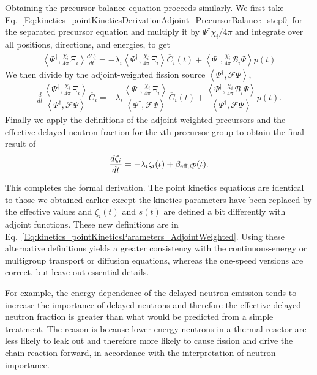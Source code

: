 Obtaining the precursor balance equation proceeds similarly. We first take Eq.~\eqref{Eq:kinetics_pointKineticsDerivationAdjoint_PrecursorBalance_step0} for the separated precursor equation and multiply it by $\Psi^\dagger \chi_i/4\pi$ and integrate over all positions, directions, and energies, to get
\begin{align}
  \left< \Psi^\dagger , \frac{\chi_i}{4\pi} \Xi_i \right> \frac{ d\overline{C}_i}{dt} = -\lambda_i   \left< \Psi^\dagger , \frac{\chi_i}{4\pi}  \Xi_i \right> \overline{C}_i(t) +  \left< \Psi^\dagger, \frac{\chi_i}{4\pi} \mathcal{B}_i \Psi \right> p(t)
\end{align}
We then divide by the adjoint-weighted fission source $\left< \Psi^\dagger, \mathcal{F} \Psi \right>$,
\begin{align}
  \frac{d}{dt} \dfrac{ \left< \Psi^\dagger , \frac{\chi_i}{4\pi} \Xi_i \right> }{ \left< \Psi^\dagger, \mathcal{F} \Psi \right> }  \overline{C}_i
 = -\lambda_i   \dfrac{ \left< \Psi^\dagger , \frac{\chi_i}{4\pi} \Xi_i \right> }{ \left< \Psi^\dagger, \mathcal{F} \Psi \right> } \overline{C}_i(t) 
 +  \dfrac{ \left< \Psi^\dagger, \frac{\chi_i}{4\pi} \mathcal{B}_i \Psi \right> }{  \left< \Psi^\dagger, \mathcal{F} \Psi \right> }  p(t) .
\end{align}
Finally we apply the definitions of the adjoint-weighted precursors and the effective delayed neutron fraction for the $i$th precursor group to obtain the final result of
\begin{align}
  \frac{d\zeta_i}{dt} = -\lambda_i \zeta_i(t) + \beta_{\textrm{eff},i} p(t) .
\end{align}

This completes the formal derivation. The point kinetics equations are identical to those we obtained earlier except the kinetics parameters have been replaced by the effective values and $\zeta_i(t)$ and $s(t)$ are defined a bit differently with adjoint functions. These new definitions are in Eq.~\eqref{Eq:kinetics_pointKineticsParameters_AdjointWeighted}. Using these alternative definitions yields a greater consistency with the continuous-energy or multigroup transport or diffusion equations, whereas the one-speed versions are correct, but leave out essential details.

For example, the energy dependence of the delayed neutron emission tends to increase the importance of delayed neutrons and therefore the effective delayed neutron fraction is greater than what would be predicted from a simple treatment. The reason is because lower energy neutrons in a thermal reactor are less likely to leak out and therefore more likely to cause fission and drive the chain reaction forward, in accordance with the interpretation of neutron importance. 

